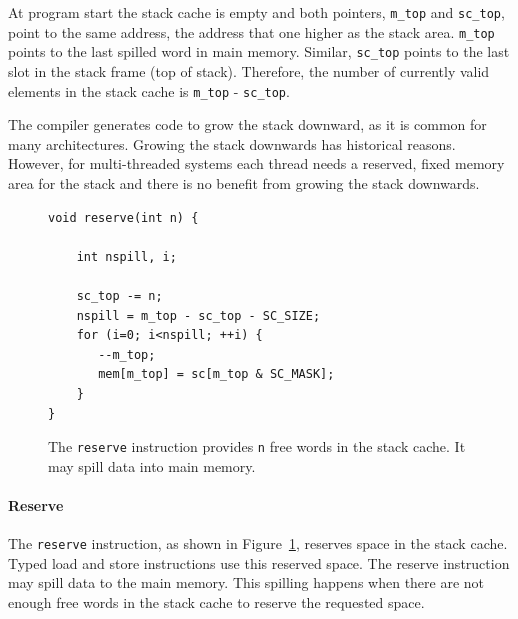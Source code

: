\documentclass[a4paper,fontsize=10pt,twoside,DIV15,BCOR12mm,headinclude=true,footinclude=false,pagesize,bibtotoc]{scrbook}
\newcommand{\code}[1]{{\texttt{#1}}}
\begin{document}
At program start the stack cache is empty and both pointers,
\code{m\_top} and \code{sc\_top}, point to the same address,
the address that one higher as the stack area. \code{m\_top}
points to the last spilled word in main memory.
Similar, \code{sc\_top} points to the last slot in the stack
frame (top of stack). Therefore, the number of currently valid
elements in the stack cache is \code{m\_top} - \code{sc\_top}.

The compiler generates code to grow the stack downward,
as it is common for many architectures. Growing the stack downwards
has historical reasons. However, for multi-threaded
systems each thread needs a reserved, fixed memory area
for the stack and there is no benefit from growing the stack
downwards.

%
%
%
%
%
%

\begin{figure}
\begin{lstlisting}
void reserve(int n) {

    int nspill, i;

    sc_top -= n;
    nspill = m_top - sc_top - SC_SIZE;
    for (i=0; i<nspill; ++i) {
       --m_top;
       mem[m_top] = sc[m_top & SC_MASK];
    }
}
	\end{lstlisting}
 	 \caption{The \code{reserve} instruction provides \code{n}
	 free words in the stack cache. It may spill data into main memory.}
 	 \label{fig:res_iml}
\end{figure}


\paragraph{Reserve} The \code{reserve} instruction, as shown in Figure~\ref{fig:res_iml},
reserves space in the stack cache. Typed load and store instructions use
this reserved space. The reserve instruction may spill data to the
main memory. This spilling happens when there are not enough free words in the
stack cache to reserve the requested space.
\end{document}
